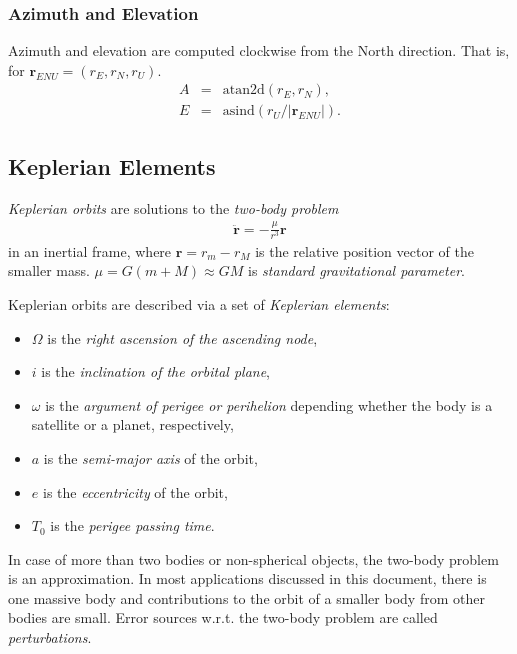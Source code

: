 \documentclass [12pt, a4paper] {article}
\newcommand{\vc}[1]
{
	\boldsymbol{#1}
}
\begin{document}
\subsubsection{Azimuth and Elevation}
Azimuth and elevation are computed clockwise from the North direction.
That is, for $\vc r_{ENU} = (r_E, r_N, r_U)$.
\begin {eqnarray}
  A &=& \textrm{atan2d}(r_E, r_N), \\ 
  E &=& \textrm{asind}(r_U / |\vc r_{ENU}|).
\end {eqnarray}


\subsection{Keplerian Elements}
\emph{Keplerian orbits} are solutions to the \emph{two-body problem}
\begin {eqnarray}
  \ddot{\vc r} = -\frac{\mu}{r^3}\vc r
\end {eqnarray}
in an inertial frame, where $\vc r=r_m - r_M$ is the relative position vector 
of the smaller mass. $\mu = G(m + M)\approx GM$ is \emph{standard gravitational 
parameter}. 

Keplerian orbits are described via a set of \emph{Keplerian elements}:
\begin {itemize}
  \item $\Omega$ is the \emph{right ascension of the ascending node},
  \item $i$ is the \emph{inclination of the orbital plane},
  \item $\omega$ is the \emph{argument of perigee or perihelion} depending whether
  the body is a satellite or a planet, respectively, 
  \item $a$ is the \emph{semi-major axis} of the orbit,
  \item $e$ is the \emph{eccentricity} of the orbit,
  \item $T_0$ is the \emph{perigee passing time}.
\end {itemize}

In case of more than two bodies or non-spherical objects, the two-body problem
is an approximation. In most applications discussed in this document, there is
one massive body and contributions to the orbit of a smaller body from other 
bodies are small. Error sources w.r.t. the two-body problem are called 
\emph{perturbations}.
\end{document}

